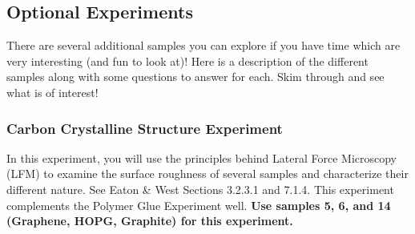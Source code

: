 \documentclass{../lab}
\begin{document}


\subsection{Optional Experiments}
\label{subsec:optional_experiments}

There are several additional samples you can explore if you have time which are very interesting (and fun to look at)! Here is a description of the different samples along with some questions to answer for each. Skim through and see what is of interest!

\subsubsection{Carbon Crystalline Structure Experiment}
\label{subsec:CarbonCrystal}

In this experiment, you will use the principles behind Lateral Force Microscopy (LFM) to examine the surface roughness of several samples and characterize their different nature. See Eaton \& West Sections 3.2.3.1 and 7.1.4. This experiment complements the Polymer Glue Experiment well. \textbf{Use samples 5, 6, and 14 (Graphene, HOPG, Graphite) for this experiment.}

\end{document}
